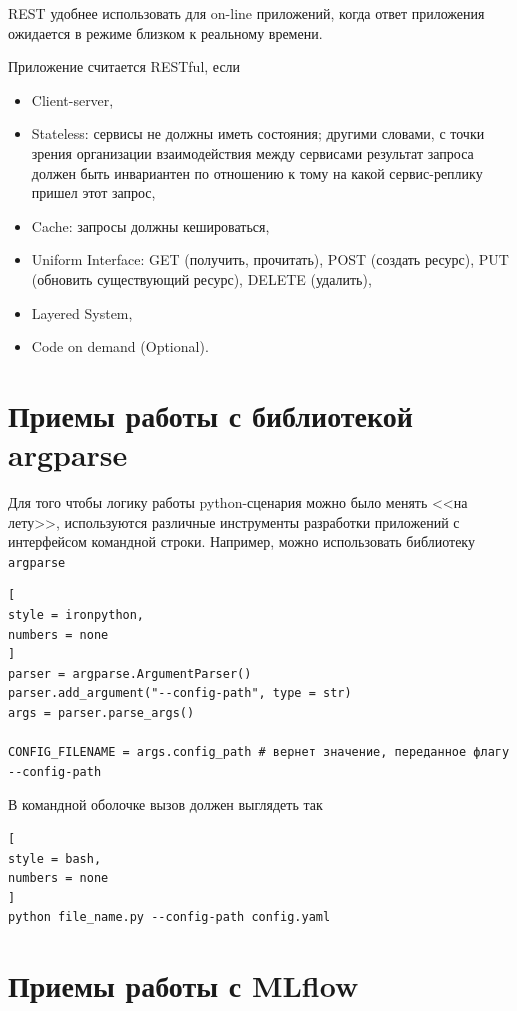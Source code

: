 \documentclass[%
	11pt,
	a4paper,
	utf8,
		]{article}
\begin{document}
REST удобнее использовать для on-line приложений, когда ответ приложения ожидается в режиме близком к реальному времени.

Приложение считается RESTful, если
\begin{itemize}
	\item Client-server,
	
	\item Stateless: сервисы не должны иметь состояния; другими словами, с точки зрения организации взаимодействия между сервисами результат запроса должен быть инвариантен по отношению к тому на какой сервис-реплику пришел этот запрос,
	
	\item Cache: запросы должны кешироваться,
	
	\item Uniform Interface: GET (получить, прочитать), POST (создать ресурс), PUT (обновить существующий ресурс), DELETE (удалить),
	
	\item Layered System,
	
	\item Code on demand (Optional).
\end{itemize}


\section{Приемы работы с библиотекой argparse}

Для того чтобы логику работы python-сценария можно было менять <<на лету>>, используются различные инструменты разработки приложений с интерфейсом командной строки. Например, можно использовать библиотеку \texttt{argparse} 
\begin{lstlisting}[
style = ironpython,
numbers = none	
]
parser = argparse.ArgumentParser()
parser.add_argument("--config-path", type = str)
args = parser.parse_args()

CONFIG_FILENAME = args.config_path # вернет значение, переданное флагу --config-path
\end{lstlisting}

В командной оболочке вызов должен выглядеть так
\begin{lstlisting}[
style = bash,
numbers = none
]
python file_name.py --config-path config.yaml
\end{lstlisting}


\section{Приемы работы с MLflow}
\end{document}
